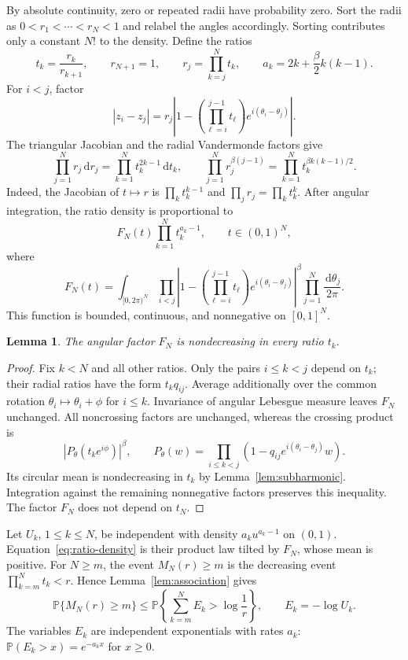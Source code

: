 \documentclass[11pt,a4paper]{article}
\numberwithin{equation}{section}
\newtheorem{lemma}[theorem]{Lemma}
\theoremstyle{remark}
\newcommand{\Prob}{\mathbb P}
\newcommand{\dd}{\,\mathrm d}
\begin{document}
By absolute continuity, zero or repeated radii have probability zero.
Sort the radii as $0<r_1<\cdots<r_N<1$ and relabel the angles
accordingly. Sorting contributes only a constant $N!$ to the density.
Define the ratios
\begin{equation}\label{eq:ratios}
 t_k=\frac{r_k}{r_{k+1}},\qquad r_{N+1}=1,
 \qquad r_j=\prod_{k=j}^N t_k,
 \qquad a_k=2k+\frac{\beta}{2}k(k-1).
\end{equation}
For $i<j$, factor
\[
 |z_i-z_j|=r_j\left|1-
   \left(\prod_{\ell=i}^{j-1}t_\ell\right)
        e^{i(\theta_i-\theta_j)}\right|.
\]
The triangular Jacobian and the radial Vandermonde factors give
\[
 \prod_{j=1}^N r_j\dd r_j=\prod_{k=1}^N t_k^{2k-1}\dd t_k,
 \qquad
 \prod_{j=1}^N r_j^{\beta(j-1)}
 =\prod_{k=1}^N t_k^{\beta k(k-1)/2}.
\]
Indeed, the Jacobian of $t\mapsto r$ is $\prod_k t_k^{k-1}$ and
$\prod_jr_j=\prod_kt_k^k$.
After angular integration, the ratio density is proportional to
\begin{equation}\label{eq:ratio-density}
 F_N(t)\prod_{k=1}^N t_k^{a_k-1},\qquad t\in(0,1)^N,
\end{equation}
where
\[
 F_N(t)=\int_{[0,2\pi)^N}
 \prod_{i<j}\left|1-
   \left(\prod_{\ell=i}^{j-1}t_\ell\right)
        e^{i(\theta_i-\theta_j)}\right|^\beta
       \prod_{j=1}^N\frac{\dd\theta_j}{2\pi}.
\]
This function is bounded, continuous, and nonnegative on $[0,1]^N$.

\begin{lemma}\label{lem:angular}
The angular factor $F_N$ is nondecreasing in every ratio $t_k$.
\end{lemma}
\begin{proof}
Fix $k<N$ and all other ratios. Only the pairs $i\le k<j$ depend
on $t_k$; their radial ratios have the form $t_kq_{ij}$.
Average additionally over the common rotation
$\theta_i\mapsto\theta_i+\phi$ for $i\le k$.
Invariance of angular Lebesgue measure leaves $F_N$ unchanged.
All noncrossing factors are unchanged, whereas the crossing product is
\[
 |P_\theta(t_ke^{i\phi})|^\beta,
 \qquad P_\theta(w)=\prod_{i\le k<j}
          (1-q_{ij}e^{i(\theta_i-\theta_j)}w).
\]
Its circular mean is nondecreasing in $t_k$ by
Lemma~\ref{lem:subharmonic}. Integration against the remaining
nonnegative factors preserves this inequality.
The factor $F_N$ does not depend on $t_N$.
\end{proof}

Let $U_k$, $1\le k\le N$, be independent with density
$a_ku^{a_k-1}$ on $(0,1)$. Equation~\eqref{eq:ratio-density} is
their product law tilted by $F_N$, whose mean is positive.
For $N\ge m$, the event $M_N(r)\ge m$ is the decreasing event
$\prod_{k=m}^N t_k<r$. Hence Lemma~\ref{lem:association} gives
\begin{equation}\label{eq:comparison}
 \Prob\{M_N(r)\ge m\}
 \le\Prob\left\{\sum_{k=m}^N E_k>\log\frac1r\right\},
 \qquad E_k=-\log U_k.
\end{equation}
The variables $E_k$ are independent exponentials with rates $a_k$:
$\Prob(E_k>x)=e^{-a_kx}$ for $x\ge0$.
\end{document}
